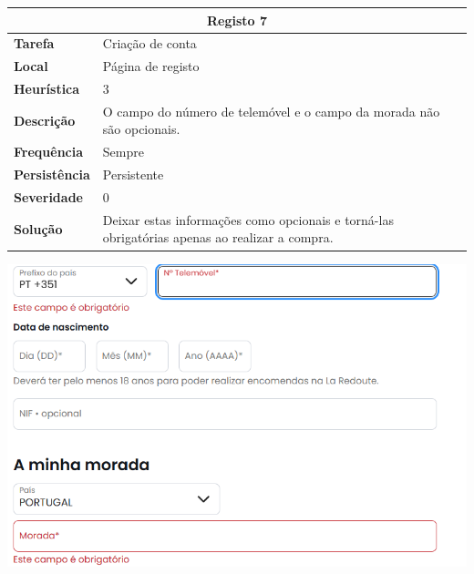 \documentclass[a4paper,12pt]{article}
\begin{document}
\begin{center}
    \newpage
    \begin{table}[h!]
        \centering
        \begin{tabular}{|m{3cm}|m{12cm}|}
            \hline
            \multicolumn{2}{|c|}{\textbf{Registo 7}}                                                                              \\ \hline
            \textbf{Tarefa}       & Criação de conta                                                                              \\ \hline
            \textbf{Local}        & Página de registo                                                                             \\ \hline
            \textbf{Heurística}   & 3                                                                                             \\ \hline
            \textbf{Descrição}    & O campo do número de telemóvel e o campo da morada não são opcionais.                         \\ \hline
            \textbf{Frequência}   & Sempre                                                                                        \\ \hline
            \textbf{Persistência} & Persistente                                                                                   \\ \hline
            \textbf{Severidade}   & 0                                                                                             \\ \hline
            \textbf{Solução}      & Deixar estas informações como opcionais e torná-las obrigatórias apenas ao realizar a compra. \\ \hline
        \end{tabular}
    \end{table}

    \vspace{0.5cm}
    \includegraphics[width=\textwidth, keepaspectratio]{heuristics/06telefone_registo.png}


\end{center}
\end{document}
